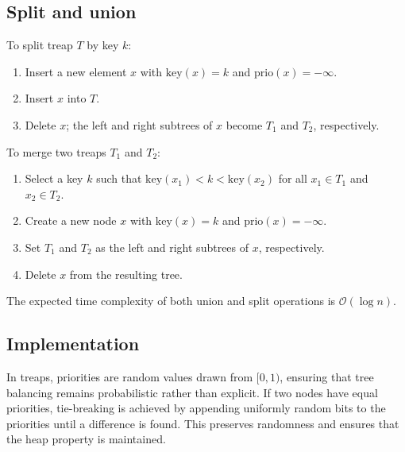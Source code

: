 \subsection{Split and union}
To split treap $T$ by key $k$:
\begin{enumerate}
    \item Insert a new element $x$ with $\text{key}(x) = k$ and $\text{prio}(x) = -\infty$.
    \item Insert $x$ into $T$.
    \item Delete $x$; the left and right subtrees of $x$ become $T_1$ and $T_2$, respectively.
\end{enumerate}

To merge two treaps $T_1$ and $T_2$:
\begin{enumerate}
    \item Select a key $k$ such that $\text{key}(x_1) < k < \text{key}(x_2)$ for all $x_1 \in T_1$ and $x_2 \in T_2$. 
    \item Create a new node $x$ with $\text{key}(x) = k$ and $\text{prio}(x) = -\infty$. 
    \item Set $T_1$ and $T_2$ as the left and right subtrees of $x$, respectively. 
    \item Delete $x$ from the resulting tree.
\end{enumerate}
\begin{lemma} 
    The expected time complexity of both union and split operations is $\mathcal{O}(\log n)$.
\end{lemma}

\subsection{Implementation}
In treaps, priorities are random values drawn from $[0, 1)$, ensuring that tree balancing remains probabilistic rather than explicit.
If two nodes have equal priorities, tie-breaking is achieved by appending uniformly random bits to the priorities until a difference is found. 
This preserves randomness and ensures that the heap property is maintained.
